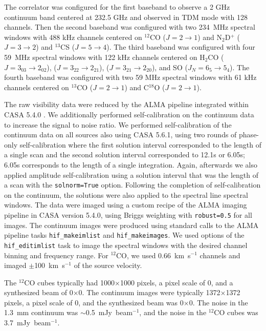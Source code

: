 \documentclass[linenumbers,twocolumn, twocolappendix]{aastex631}
\begin{document}
The correlator was configured for the first baseband to observe a 2 GHz continuum band centered at 232.5 GHz and observed in TDM mode with 128 channels. Then the second baseband was configured with two 234~MHz spectral windows with 488 kHz channels centered on $^{12}$CO ($J=2\rightarrow1$) and N$_2$D$^{+}$ ($J=3\rightarrow2$) and $^{13}$CS ($J=5\rightarrow4$). The third baseband was configured with four 59~MHz spectral windows with 122 kHz channels centered on H$_2$CO ($J=3_{03}\rightarrow2_{02}$), ($J=3_{22}\rightarrow2_{21}$),  ($J=3_{21}\rightarrow2_{20}$), and SO ($J_N = 6_5\rightarrow5_4$). The fourth baseband was configured with two 59 MHz spectral windows with 61 kHz channels centered on $^{13}$CO ($J=2\rightarrow1$) and C$^{18}$O ($J=2\rightarrow1$).

The raw visibility data were reduced by the ALMA pipeline integrated within CASA 5.4.0 \citep{CASA}. We additionally performed self-calibration on the continuum data to increase the signal to noise ratio. We performed self-calibration of the continuum data on all sources also using CASA 5.6.1, using two rounds of phase-only self-calibration where the first solution interval corresponded to the length of a single scan and the second solution interval corresponded to 12.1s or 6.05s; 6.05s corresponds to the length of a single integration. Again, afterwards we also applied amplitude self-calibration using a solution interval that was the length of a scan with the \texttt{solnorm=True} option. Following the completion of self-calibration on the continuum, the solutions were also applied to the spectral line spectral windows. The data were imaged using a custom recipe of the ALMA imaging pipeline in CASA version 5.4.0, using Briggs weighting with \texttt{robust=0.5} for all images. The continuum images were produced using standard calls to the ALMA pipeline tasks \texttt{hif\_makeimlist} and \texttt{hif\_makeimages}. We used options of the \texttt{hif\_editimlist} task to image the spectral windows with the desired channel binning and frequency range. For $^{12}$CO, we used 0.66~km~s$^{-1}$ channels and imaged $\pm$100~km~s$^{-1}$ of the source velocity. 

The $^{12}$CO cubes typically had 1000$\times$1000 pixels, a pixel scale of 0, and a synthesized beam of 0$\times$0. The continuum images were typically 1372$\times$1372 pixels, a pixel scale of 0, and the synthesized beam was 0$\times$0. The noise in the 1.3~mm continuum was $\sim$0.5~mJy~beam$^{-1}$, and the noise in the $^{12}$CO cubes was 3.7~mJy~beam$^{-1}$.
\end{document}
